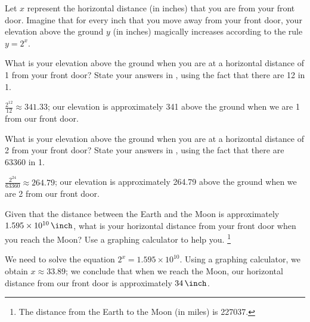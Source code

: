 \investigation*{}
\begin{problem}
Let $x$ represent the horizontal
distance (in inches) that you are from your front door. Imagine that
for every inch that you move away from your front door,
your elevation above the ground $y$ (in inches) magically increases
according to the rule $y=2^x$. 
\begin{subproblem}
	What is your elevation above the ground when you are at a horizontal distance of \SI{1}{\foot}
	from your front door? State your answers in \si{\foot}, using the fact that there are \SI{12}{\inch}
	in \SI{1}{\foot}.
	\begin{shortsolution}
		$\frac{2^{12}}{12}\approx 341.33$; our elevation is approximately \SI{341}{\foot} above the ground when 
		we are \SI{1}{\foot} from our front door.
	\end{shortsolution}
\end{subproblem}
\begin{subproblem}
	What is your elevation above the ground when you are at a horizontal distance of \SI{2}{\foot}
	from your front door? State your answers in \si{\mile}, using the fact that there are \SI{63360}{\inch}
	in \SI{1}{\mile}.
	\begin{shortsolution}
		$\frac{2^{24}}{63360}\approx 264.79$; our elevation is approximately \SI{264.79}{\mile} above the ground when
		we are \SI{2}{\foot} from our front door.
	\end{shortsolution}
\end{subproblem}
\begin{subproblem}
	Given that the distance between
	the Earth and the Moon is approximately $\SI{1.595 e10}{\inch}$,
	what is your horizontal distance from your front door when you reach the Moon?
	Use a graphing calculator to help you.
	\footnote{The distance from the Earth to the Moon (in miles) is \SI{227037}{\mile}.}
	\begin{shortsolution}
		We need to solve the equation $2^x=1.595\times 10^{10}$. Using a graphing
		calculator, we obtain $x\approx 33.89$; we conclude that when we reach the Moon,
		our horizontal distance from our front door is approximately $\SI{34}{\inch}$.
	\end{shortsolution}
\end{subproblem}
\end{problem}


